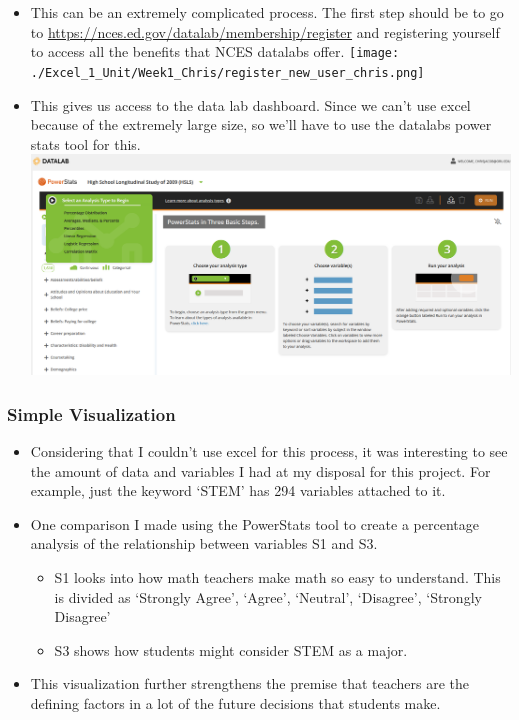 \documentclass[
  letterpaper,
  DIV=11,
  numbers=noendperiod]{scrreprt}
\providecommand{\tightlist}{%
  \setlength{\itemsep}{0pt}\setlength{\parskip}{0pt}}\usepackage{longtable,booktabs,array}
\begin{document}
\begin{itemize}
\tightlist
\item
  This can be an extremely complicated process. The first step should be
  to go to \url{https://nces.ed.gov/datalab/membership/register} and
  registering yourself to access all the benefits that NCES datalabs
  offer.
  \texttt{[image: ./Excel\_1\_Unit/Week1\_Chris/register\_new\_user\_chris.png]}
\item
  This gives us access to the data lab dashboard. Since we can't use
  excel because of the extremely large size, so we'll have to use the
  datalabs power stats tool for this.
  \includegraphics{./Excel_1_Unit/Week1_Chris/datalabs_overview.png}
\end{itemize}

\subsubsection{Simple Visualization}\label{simple-visualization}

\begin{itemize}
\item
  Considering that I couldn't use excel for this process, it was
  interesting to see the amount of data and variables I had at my
  disposal for this project. For example, just the keyword `STEM' has
  294 variables attached to it.
\item
  One comparison I made using the PowerStats tool to create a percentage
  analysis of the relationship between variables S1 and S3.

  \begin{itemize}
  \tightlist
  \item
    S1 looks into how math teachers make math so easy to understand.
    This is divided as `Strongly Agree', `Agree', `Neutral', `Disagree',
    `Strongly Disagree'
  \item
    S3 shows how students might consider STEM as a major.
  \end{itemize}
\item
  This visualization further strengthens the premise that teachers are
  the defining factors in a lot of the future decisions that students
  make.
\end{itemize}
\end{document}
